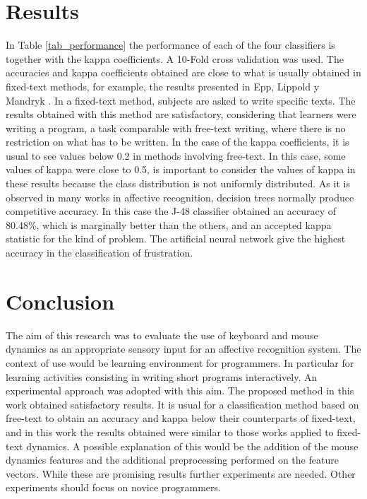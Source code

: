 \documentclass[a4paper]{llncs}
\begin{document}
\section{Results}
\label{sec:res} 
In Table \ref{tab_performance} the performance of each of the four classifiers is together 
with the kappa coefficients. A 10-Fold cross validation was used. 
The accuracies and kappa coefficients obtained are close to what is
usually obtained in fixed-text methods, for example, the results presented in
Epp, Lippold y Mandryk \cite{epp2011identifying}. %
In a fixed-text method, subjects are asked to write specific texts.											 
The results obtained with this method are satisfactory, considering that learners
were writing a program, a task comparable with free-text writing, where there
is no restriction on what has to be written. %
In the case of the kappa coefficients, it is
usual to see values below 0.2 in methods involving free-text. In this case, some
values of kappa were close to 0.5, is important to consider the values of kappa
in these results because the class distribution is not uniformly distributed. As
it is observed in many works in affective recognition, decision trees normally
produce competitive accuracy. In this case the J-48 classifier obtained an
accuracy of 80.48\%, which is marginally better than the others, and an accepted kappa
statistic for the kind of problem. The artificial neural network %
give the highest
accuracy in the classification of frustration.

 
\section{Conclusion}
The aim of this research was to evaluate the use of keyboard and mouse dynamics 
as an appropriate sensory input for an affective recognition system. The context
of use would be learning environment for programmers. In particular for learning
activities consisting in writing short programs interactively. An experimental
approach was adopted with this aim. The proposed method in this work obtained
satisfactory results. It is usual for a classification method based on free-text
to obtain an accuracy and kappa below their counterparts of fixed-text, and in this
work the results obtained were similar to those works applied to fixed-text 
dynamics. A possible explanation of this would be the addition of the mouse 
dynamics features and the additional preprocessing performed on the feature vectors. 
While these are promising results further experiments are needed. Other experiments
should focus on novice programmers.
\end{document}

